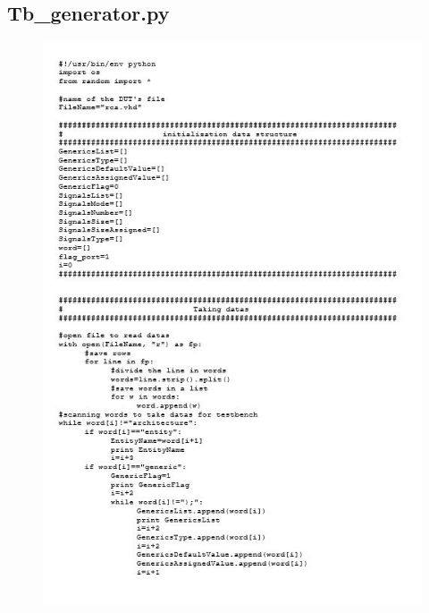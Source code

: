 \subsection{Tb\_generator.py}
\begin{figure}[!htb]
	\centering
	\includegraphics[scale=1]{immagini/tbgen1}
	\label{tbgen1}
\end{figure}
